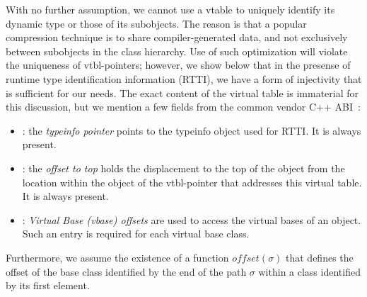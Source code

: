 \noindent
With no further assumption, we cannot use a vtable to uniquely identify
its dynamic type or those of its subobjects. The reason is that a popular 
compression technique is to share compiler-generated data, and not exclusively
between subobjects in the class hierarchy.
Use of such optimization will violate the 
uniqueness of vtbl-pointers; however, we show below that in the presense of 
runtime type identification information (RTTI), we have a form of injectivity
that is sufficient for our needs.
The exact content of the virtual table  
is immaterial for this discussion, but we mention a few fields
from the common vendor C++ ABI~\cite[.2]{C++ABI}:
\begin{itemize}
\setlength{\itemsep}{0pt}
\setlength{\parskip}{0pt}
\item {}: the \emph{typeinfo pointer} points 
  to the typeinfo object used for RTTI. It is always present.  
\item {}: the \emph{offset to top} holds 
  the displacement to the top of the object  
  from the location within the object of the vtbl-pointer that 
  addresses this virtual table. It is always present.
\item {}: \emph{Virtual Base (vbase) offsets} are
  used to access the virtual bases 
  of an object. Such an entry is required for each virtual base class.
\end{itemize}
\noindent
Furthermore, we assume the existence of a function $\mathit{offset}(\sigma)$ 
that defines the offset of the base class identified by the end
of the path $\sigma$ within a 
class identified by its first element.

